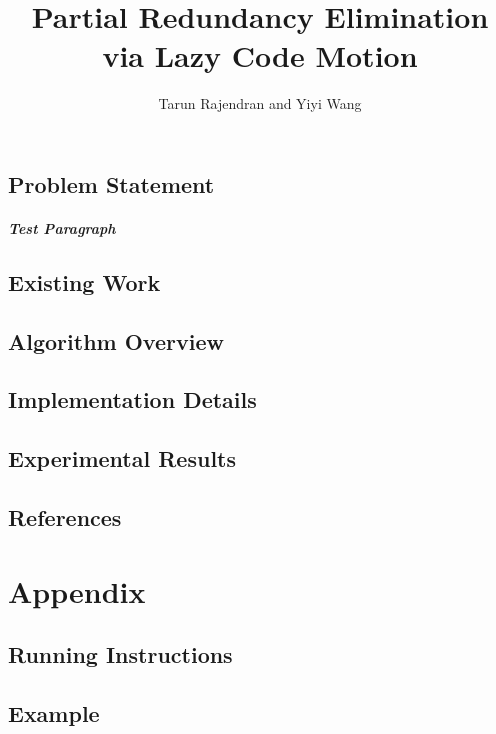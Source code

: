 \documentclass{report}
\author{Tarun Rajendran and Yiyi Wang}
\title{Partial Redundancy Elimination via Lazy Code Motion}
\begin{document}
\maketitle

\section*{Problem Statement}
\paragraph{Test Paragraph}

\section*{Existing Work}

\section*{Algorithm Overview}

\section*{Implementation Details}

\section*{Experimental Results}

\section*{References}

\chapter*{Appendix}

\section*{Running Instructions}

\section*{Example}
\end{document}
